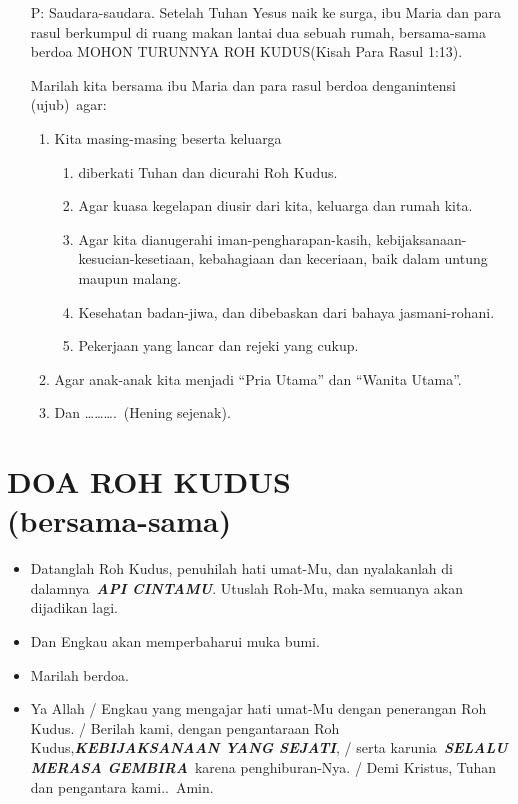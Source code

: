 \documentclass{scrartcl}
\newcommand{\roleSay}[2]{\begin{itemize} \item[#1:] #2 \end{itemize}}
\newcommand{\BP}[1]{\roleSay{P}{#1}}
\begin{document}
\BP{Saudara-saudara. Setelah Tuhan Yesus naik ke surga, ibu Maria dan
para rasul berkumpul di ruang makan lantai dua sebuah rumah,
bersama-sama berdoa MOHON TURUNNYA ROH KUDUS(Kisah Para Rasul 1:13).

Marilah kita bersama ibu Maria dan para rasul berdoa denganintensi
(ujub)~agar:
\begin{enumerate}
\item Kita masing-masing beserta
keluarga
\begin{enumerate}
\item diberkati Tuhan dan
dicurahi Roh
Kudus. 
\item Agar kuasa kegelapan diusir dari kita, keluarga dan rumah kita.

\item Agar kita dianugerahi iman-pengharapan-kasih,
kebijaksanaan-kesucian-kesetiaan, kebahagiaan dan keceriaan, baik dalam
untung maupun malang.

\item Kesehatan badan-jiwa, dan dibebaskan dari bahaya
jasmani-rohani.

\item Pekerjaan yang lancar dan rejeki yang cukup.
\end{enumerate} 

\item Agar anak-anak kita menjadi {\textquotedblleft}Pria
Utama{\textquotedblright} dan {\textquotedblleft}Wanita
Utama{\textquotedblright}.

\item Dan {\dots}{\dots}{\dots}.~(Hening sejenak).
\end{enumerate}
}
\section{DOA ROH KUDUS\\(bersama-sama)}
\begin{itemize}
\item Datanglah Roh Kudus, penuhilah hati umat-Mu, dan nyalakanlah di
dalamnya~\textbf{\emph{API CINTAMU}}. Utuslah Roh-Mu, maka semuanya
akan dijadikan lagi.

\item Dan Engkau akan memperbaharui muka bumi.

\item Marilah berdoa.

\item Ya Allah / Engkau yang mengajar hati umat-Mu dengan penerangan Roh
Kudus. / Berilah kami, dengan pengantaraan Roh
Kudus,\textbf{\emph{KEBIJAKSANAAN YANG SEJATI}}, / serta
karunia~\textbf{\emph{SELALU MERASA GEMBIRA}}~karena penghiburan-Nya. /
Demi Kristus, Tuhan dan pengantara kami..~Amin.
\end{itemize}
\end{document}
